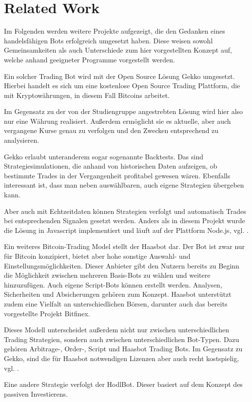 \section{Related Work}
Im Folgenden werden weitere Projekte aufgezeigt, die den Gedanken eines handelsfähigen Bots
erfolgreich umgesetzt haben. Diese weisen sowohl Gemeinsamkeiten als auch Unterschiede zum hier
vorgestellten Konzept auf, welche anhand geeigneter Programme vorgestellt werden.

Ein solcher Trading Bot wird mit der Open Source Lösung Gekko umgesetzt.
Hierbei handelt es sich um eine kostenlose Open Source Trading Plattform, die mit
Kryptowährungen, in diesem Fall Bitcoins arbeitet.

Im Gegensatz zu der von der Studiengruppe
angestrebten Lösung wird hier also nur eine Währung realisiert. Außerdem ermöglicht sie es aktuelle,
aber auch vergangene Kurse genau zu verfolgen und den Zwecken entsprechend zu analysieren. 

Gekko erlaubt unteranderem sogar sogenannte Backtests. Das sind Strategiesimulationen, die anhand von
historischen Daten aufzeigen, ob bestimmte Trades in der Vergangenheit profitabel gewesen wären.
Ebenfalls interessant ist, dass man neben auswählbaren, auch eigene Strategien übergeben kann.

Aber auch mit Echtzeitdaten können Strategien verfolgt und automatisch Trades bei entsprechenden
Signalen gesetzt werden. Anders als in diesem Projekt wurde die Lösung in Javascript implementiert
und läuft auf der Plattform Node.js, vgl. \cite{gekko2}.
 
Ein weiteres Bitcoin-Trading Model stellt der Haasbot dar. Der Bot ist zwar nur für Bitcoin konzipiert,
bietet aber hohe sonstige Auswahl- und Einstellungsmöglichkeiten. Dieser Anbieter gibt den
Nutzern bereits zu Beginn die Möglichkeit zwischen mehreren Basis-Bots zu wählen und weitere
hinzuzufügen. Auch eigene Script-Bots können erstellt werden. Analysen, Sicherheiten und
Absicherungen gehören zum Konzept. Haasbot unterstützt zudem eine Vielfalt an
unterschiedlichen Börsen, darunter auch das bereits vorgestellte Projekt Bitfinex.

Dieses Modell unterscheidet außerdem nicht nur zwischen unterschiedlichen Trading Strategien, sondern auch
zwischen unterschiedlichen Bot-Typen. Dazu gehören Arbitrage-, Order-, Script und Haasbot Trading
Bots. Im Gegensatz zu Gekko, sind die für Haasbot notwendigen Lizenzen aber auch recht kostspielig, vgl. \cite{haasbot}.

Eine andere Strategie verfolgt der HodlBot. Dieser basiert auf dem Konzept des passiven
Investierens.

